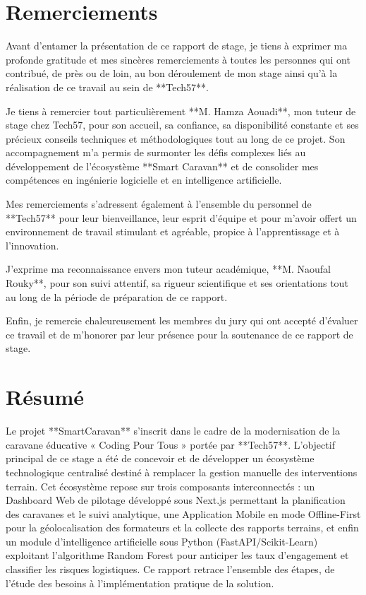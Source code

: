 \documentclass[12pt,a4paper]{report}
\begin{document}
\chapter*{Remerciements}
Avant d’entamer la présentation de ce rapport de stage, je tiens à exprimer ma profonde gratitude et mes sincères remerciements à toutes les personnes qui ont contribué, de près ou de loin, au bon déroulement de mon stage ainsi qu'à la réalisation de ce travail au sein de **Tech57**.

Je tiens à remercier tout particulièrement **M. Hamza Aouadi**, mon tuteur de stage chez Tech57, pour son accueil, sa confiance, sa disponibilité constante et ses précieux conseils techniques et méthodologiques tout au long de ce projet. Son accompagnement m'a permis de surmonter les défis complexes liés au développement de l'écosystème **Smart Caravan** et de consolider mes compétences en ingénierie logicielle et en intelligence artificielle.

Mes remerciements s'adressent également à l'ensemble du personnel de **Tech57** pour leur bienveillance, leur esprit d'équipe et pour m’avoir offert un environnement de travail stimulant et agréable, propice à l’apprentissage et à l'innovation.

J'exprime ma reconnaissance envers mon tuteur académique, **M. Naoufal Rouky**, pour son suivi attentif, sa rigueur scientifique et ses orientations tout au long de la période de préparation de ce rapport.

Enfin, je remercie chaleureusement les membres du jury qui ont accepté d'évaluer ce travail et de m'honorer par leur présence pour la soutenance de ce rapport de stage.

\newpage

\chapter*{Résumé}
Le projet **SmartCaravan** s’inscrit dans le cadre de la modernisation de la caravane éducative « Coding Pour Tous » portée par **Tech57**. L'objectif principal de ce stage a été de concevoir et de développer un écosystème technologique centralisé destiné à remplacer la gestion manuelle des interventions terrain. Cet écosystème repose sur trois composants interconnectés : un Dashboard Web de pilotage développé sous Next.js permettant la planification des caravanes et le suivi analytique, une Application Mobile en mode Offline-First pour la géolocalisation des formateurs et la collecte des rapports terrains, et enfin un module d'intelligence artificielle sous Python (FastAPI/Scikit-Learn) exploitant l'algorithme Random Forest pour anticiper les taux d'engagement et classifier les risques logistiques. Ce rapport retrace l'ensemble des étapes, de l'étude des besoins à l'implémentation pratique de la solution.
\end{document}
